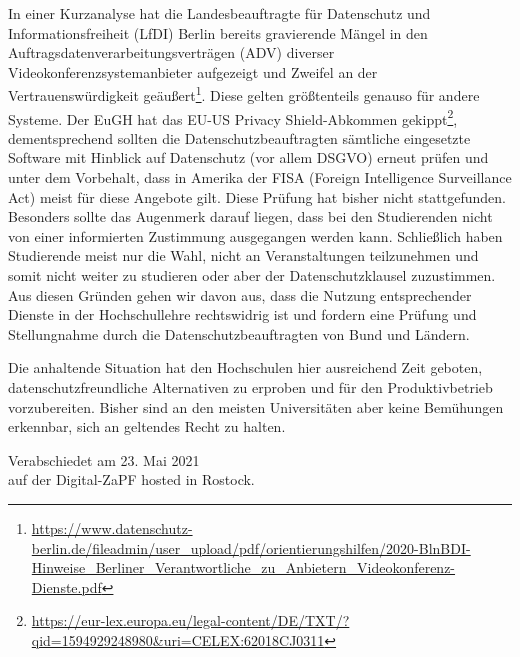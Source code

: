 \documentclass[DIV=calc]{scrartcl}
\let\oldgrqq=\grqq
\def\grqq{\oldgrqq\xspace}
\begin{document}
In einer Kurzanalyse hat die Landesbeauftragte für Datenschutz und Informationsfreiheit (LfDI) Berlin bereits gravierende Mängel in den Auftragsdatenverarbeitungsverträgen (ADV) diverser Videokonferenzsystemanbieter aufgezeigt und Zweifel an der Vertrauenswürdigkeit geäußert\footnote{\url{https://www.datenschutz-berlin.de/fileadmin/user_upload/pdf/orientierungshilfen/2020-BlnBDI-Hinweise_Berliner_Verantwortliche_zu_Anbietern_Videokonferenz-Dienste.pdf}}. Diese gelten größtenteils genauso für andere Systeme. Der EuGH hat das \glqq EU-US Privacy Shield\grqq-Abkommen gekippt\footnote{\url{https://eur-lex.europa.eu/legal-content/DE/TXT/?qid=1594929248980&uri=CELEX:62018CJ0311}}, dementsprechend sollten die Datenschutzbeauftragten sämtliche eingesetzte Software mit Hinblick auf Datenschutz (vor allem DSGVO) erneut prüfen und unter dem Vorbehalt, dass in Amerika der FISA (Foreign Intelligence Surveillance Act) meist für diese Angebote gilt. Diese Prüfung hat bisher nicht stattgefunden. Besonders sollte das Augenmerk darauf liegen, dass bei den Studierenden nicht von einer \glqq informierten Zustimmung\grqq ausgegangen werden kann. Schließlich haben Studierende meist nur die Wahl, nicht an Veranstaltungen teilzunehmen und somit nicht weiter zu studieren oder aber der Datenschutzklausel zuzustimmen. Aus diesen Gründen gehen wir davon aus, dass die Nutzung entsprechender Dienste in der Hochschullehre rechtswidrig ist und fordern eine Prüfung und Stellungnahme durch die Datenschutzbeauftragten von Bund und Ländern. 

Die anhaltende Situation hat den Hochschulen hier ausreichend Zeit geboten, datenschutzfreundliche Alternativen zu erproben und für den Produktivbetrieb vorzubereiten. Bisher sind an den meisten Universitäten aber keine Bemühungen erkennbar, sich an geltendes Recht zu halten. 

\vspace{1cm} 

\vfill
\begin{flushright}
	Verabschiedet am 23. Mai 2021 \\
	auf der Digital-ZaPF hosted in Rostock.
\end{flushright}
\end{document}
